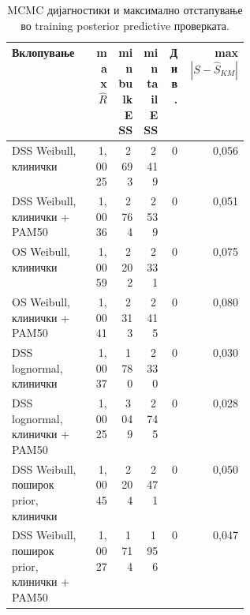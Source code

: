 \documentclass[12pt]{article}
\begin{document}
\begin{table}[ht]
\centering
\caption{MCMC дијагностики и максимално отстапување во training posterior predictive проверката.}
\label{tab:bayes-diagnostics}
\scriptsize
\begin{tabular}{p{0.35\linewidth}rrrrr}
\hline
Вклопување & max $\widehat R$ & min bulk ESS & min tail ESS & Див. & max $|S-\widehat S_{KM}|$ \\
\hline
DSS Weibull, клинички & 1,0025 & 2\,693 & 2\,419 & 0 & 0,056 \\
DSS Weibull, клинички + PAM50 & 1,0036 & 2\,764 & 2\,539 & 0 & 0,051 \\
OS Weibull, клинички & 1,0059 & 2\,202 & 2\,331 & 0 & 0,075 \\
OS Weibull, клинички + PAM50 & 1,0041 & 2\,313 & 2\,415 & 0 & 0,080 \\
DSS lognormal, клинички & 1,0037 & 1\,780 & 2\,330 & 0 & 0,030 \\
DSS lognormal, клинички + PAM50 & 1,0025 & 3\,049 & 2\,745 & 0 & 0,028 \\
DSS Weibull, поширок prior, клинички & 1,0045 & 2\,204 & 2\,471 & 0 & 0,050 \\
DSS Weibull, поширок prior, клинички + PAM50 & 1,0027 & 1\,714 & 1\,956 & 0 & 0,047 \\
\hline
\end{tabular}
\end{table}
\end{document}
